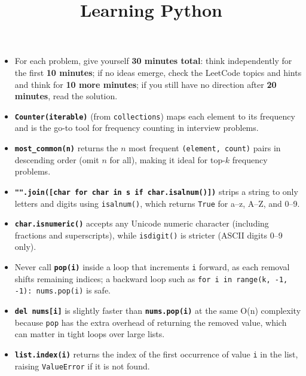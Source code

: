 \documentclass{article}
\title{Learning Python}
\author{}
\date{}
\begin{document}
\maketitle

\begin{itemize}
    \item[$\bigstar$] For each problem, give yourself \textbf{30 minutes total}: think independently for the first \textbf{10 minutes}; if no ideas emerge, check the LeetCode topics and hints and think for \textbf{10 more minutes}; if you still have no direction after \textbf{20 minutes}, read the solution.

    \item \textbf{\texttt{Counter(iterable)}} (from \texttt{collections}) maps each element to its frequency and is the go-to tool for frequency counting in interview problems.

    \item \textbf{\texttt{most\_common(n)}} returns the $n$ most frequent \texttt{(element, count)} pairs in descending order (omit $n$ for all), making it ideal for top-$k$ frequency problems.

    \item \textbf{\texttt{"".join([char for char in s if char.isalnum()])}} strips a string to only letters and digits using \texttt{isalnum()}, which returns \texttt{True} for a--z, A--Z, and 0--9.

    \item \textbf{\texttt{char.isnumeric()}} accepts any Unicode numeric character (including fractions and superscripts), while \texttt{isdigit()} is stricter (ASCII digits 0--9 only).

    \item Never call \textbf{\texttt{pop(i)}} inside a loop that increments \texttt{i} forward, as each removal shifts remaining indices; a backward loop such as \texttt{for i in range(k, -1, -1): nums.pop(i)} is safe.

    \item \textbf{\texttt{del nums[i]}} is slightly faster than \textbf{\texttt{nums.pop(i)}} at the same O(n) complexity because \texttt{pop} has the extra overhead of returning the removed value, which can matter in tight loops over large lists.

    \item \textbf{\texttt{list.index(i)}} returns the index of the first occurrence of value \texttt{i} in the list, raising \texttt{ValueError} if it is not found.


\end{itemize}
\end{document}
